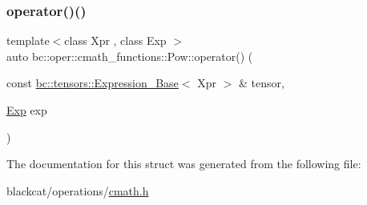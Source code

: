 \mbox{\label{structbc_1_1oper_1_1cmath__functions_1_1Pow_a88e73d16af79a5d487f7e00d7b3f5719}} 
\subsubsection{\texorpdfstring{operator()()}{operator()()}\hspace{0.1cm}{\footnotesize\ttfamily [2/2]}}
{\footnotesize\ttfamily template$<$class Xpr , class Exp $>$ \\
auto bc\+::oper\+::cmath\+\_\+functions\+::\+Pow\+::operator() (\begin{DoxyParamCaption}\item[{const \hyperlink{classbc_1_1tensors_1_1Expression__Base}{bc\+::tensors\+::\+Expression\+\_\+\+Base}$<$ Xpr $>$ \&}]{tensor,  }\item[{\hyperlink{structbc_1_1oper_1_1cmath__functions_1_1Exp}{Exp}}]{exp }\end{DoxyParamCaption})\hspace{0.3cm}{\ttfamily [inline]}}



The documentation for this struct was generated from the following file\+:\begin{DoxyCompactItemize}
\item 
blackcat/operations/\hyperlink{cmath_8h}{cmath.\+h}\end{DoxyCompactItemize}
